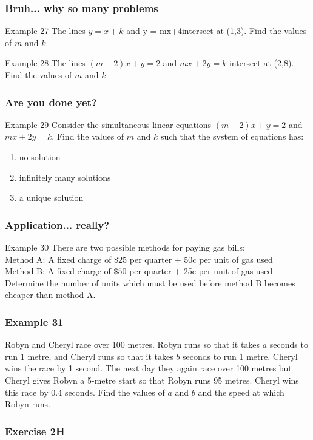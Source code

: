 \documentclass{beamer}
\newcommand{\blank}{\begin{frame}
\end{frame}}
\begin{document}
\begin{frame}[t]
    \frametitle{Bruh... why so many problems}
    \begin{block}{Example 27}
        The lines $y = x +k$ and y = mx+4intersect at (1,3). Find the values of $m$ and $k$.
    \end{block}
    \begin{block}{Example 28}
        The lines $(m-2)x+y = 2$ and $mx+2y = k$ intersect at (2,8). Find the values of $m$ and $k$.
    \end{block}
\end{frame}

\begin{frame}[t]
    \frametitle{Are you done yet?}
    \begin{block}{Example 29}
        Consider the simultaneous linear equations $(m-2)x + y = 2$ and $mx + 2y = k$. Find the
        values of $m$ and $k$ such that the system of equations has:\\
        \begin{enumerate}
            \item no solution
            \item infinitely many solutions
            \item a unique solution
        \end{enumerate}    
    \end{block}
\end{frame}

\begin{frame}[t]
    \frametitle{Application... really?}
    \begin{block}{Example 30}
        There are two possible methods for paying gas bills:\\
    Method A: A fixed charge of $\$25$ per quarter + 50c per unit of gas used\\
    Method B: A fixed charge of $\$50$ per quarter + 25c per unit of gas used\\
    Determine the number of units which must be used before method B becomes cheaper than method A.
    \end{block}
\end{frame}

\begin{frame}[t]
    \frametitle{Example 31}
    Robyn and Cheryl race over 100 metres. Robyn runs so that it takes $a$ seconds to run
    1 metre, and Cheryl runs so that it takes $b$ seconds to run 1 metre. Cheryl wins the race by
    1 second. The next day they again race over 100 metres but Cheryl gives Robyn a 5-metre
    start so that Robyn runs 95 metres. Cheryl wins this race by 0.4 seconds. Find the values
    of $a$ and $b$ and the speed at which Robyn runs.
\end{frame}
\blank

\begin{frame}
    \frametitle{Exercise 2H}
\end{frame}
\end{document}

